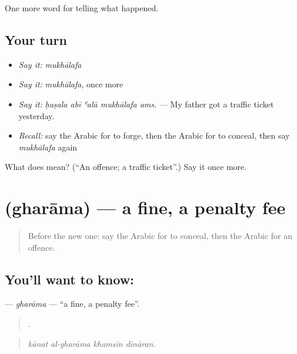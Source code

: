 \begin{grammarlens}[title={What you've built}]
One more word for telling what happened.
\end{grammarlens}

\subsection*{Your turn}
\begin{itemize}
\raggedright
  \item \emph{Say it:} \emph{mukhālafa}
  \item \emph{Say it:} \emph{mukhālafa}, once more
  \item \emph{Say it:} \emph{ḥaṣala abī ʿalā mukhālafa ams.} — My father got a traffic ticket yesterday.
  \item \emph{Recall:} say the Arabic for to forge, then the Arabic for to conceal, then say \emph{mukhālafa} again
\end{itemize}

\begin{tcolorbox}[breakable,colback=teal!4,colframe=teal!35!black,title={Before you move on}]
What does  mean? (\textquotedblleft{}An offence; a traffic ticket\textquotedblright{}.) Say it once more.
\end{tcolorbox}
\section[\texorpdfstring{\ar{غرامة} (gharāma)}{غرامة (gharāma)}]{ (gharāma) — a fine, a penalty fee}

\label{lesson:AR-C352-gharama}



\begin{quote}
Before the new one: say the Arabic for to conceal, then the Arabic for an offence.
\end{quote}

\subsection*{You'll want to know: }
\textbf{} — \emph{gharāma} — \textquotedblleft{}a fine, a penalty fee\textquotedblright{}.

\begin{quote}
   .
\end{quote}

\begin{quote}
\emph{kānat al-gharāma khamsīn dīnāran.}
\end{quote}

